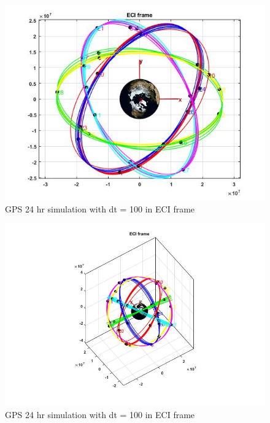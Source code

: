 \documentclass[Space3_Assign2]{subfile}
\begin{document}
\begin{figure}
\centering
\caption{GPS 24 hr simulation with dt = 100 in ECI frame}
\label{Q1AECI}
\includegraphics[width = \linewidth]{./Q1AECI.jpg}
\end{figure}

\begin{figure}
\centering
\caption{GPS 24 hr simulation with dt = 100 in ECI frame}
\label{Q1AECIside}
\includegraphics[width = \linewidth]{./Q1AECI_side.jpg}
\end{figure}
\end{document}

